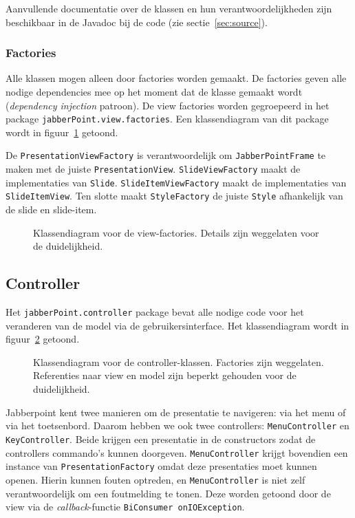 \documentclass[a4paper]{article}
\newcommand{\code}[1]{\lstinline[columns=fixed]{#1}}
\newcommand{\diagram}[3][1.3]{
	\begin{figure}[!htb]
	 \caption{#3}
	 \label{diagram:#2}
	 \makebox[\textwidth][c]{\texttt{[image: Diagrams/\#2.pdf]}}%
	\end{figure}
}
\begin{document}
		Aanvullende documentatie over de klassen en hun verantwoordelijkheden zijn beschikbaar in de Javadoc bij de code (zie sectie~\ref{sec:source}).

		\subsubsection{Factories}\label{sec:view-factories}
			Alle klassen mogen alleen door factories worden gemaakt.
			De factories geven alle nodige dependencies mee op het moment dat de klasse gemaakt wordt (\textit{dependency injection} patroon).
			De view factories worden gegroepeerd in het package \code{jabberPoint.view.factories}.
			Een klassendiagram van dit package wordt in figuur~\ref{diagram:view-factories} getoond.

			De \code{PresentationViewFactory} is verantwoordelijk om \code{JabberPointFrame} te maken met de juiste \code{PresentationView}.
			\code{SlideViewFactory} maakt de implementaties van \code{Slide}.
			\code{SlideItemViewFactory} maakt de implementaties van \code{SlideItemView}.
			Ten slotte maakt \code{StyleFactory} de juiste \code{Style} afhankelijk van de slide en slide-item.

			\diagram{view-factories}{
				Klassendiagram voor de view-factories.
				Details zijn weggelaten voor de duide\-lijk\-heid.
			}

	\subsection{Controller}\label{sec:controller}
		Het \code{jabberPoint.controller} package bevat alle nodige code voor het veranderen van de model via de gebruikersinterface.
		Het klassendiagram wordt in figuur~\ref{diagram:controller} getoond.

		\diagram{controller}{
			Klassendiagram voor de controller-klassen.
			Factories zijn weggelaten.
			Referenties naar view en model zijn beperkt gehouden voor de duidelijkheid.
		}

		Jabberpoint kent twee manieren om de presentatie te navigeren: via het menu of via het toetsenbord.
		Daarom hebben we ook twee controllers: \code{Menu}\-\code{Controller} en \code{KeyController}.
		Beide krijgen een presentatie in de constructors zodat de controllers commando's kunnen doorgeven.
		\code{MenuController} krijgt bovendien een instance van \code{PresentationFactory} omdat deze presentaties moet kunnen openen.
		Hierin kunnen fouten optreden, en \code{MenuController} is niet zelf verantwoordelijk om een foutmelding te tonen.
		Deze worden getoond door de view via de \textit{callback}-functie \code{BiConsumer onIOException}.
\end{document}
